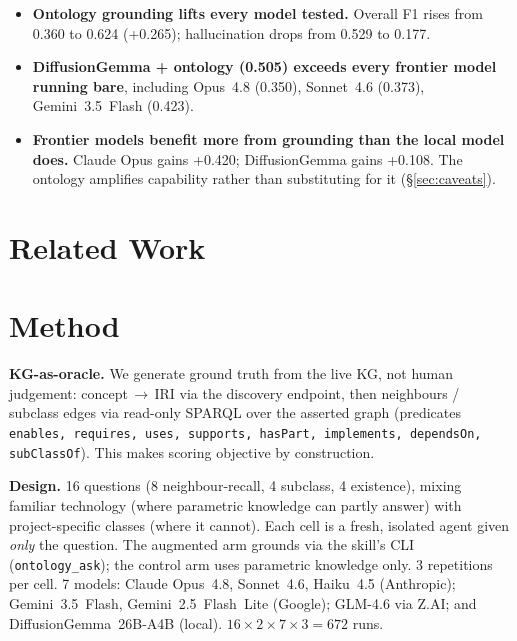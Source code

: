 \documentclass[11pt]{article}
\begin{document}
\begin{samepage}
\begin{itemize}[leftmargin=1.3em,nosep]
\item \textbf{Ontology grounding lifts every model tested.} Overall F1 rises from 0.360 to
      0.624 (\textcolor{burnt}{+0.265}); hallucination drops from 0.529 to 0.177.
\item \textbf{DiffusionGemma + ontology (0.505) exceeds every frontier model running bare},
      including Opus~4.8 (0.350), Sonnet~4.6 (0.373), Gemini~3.5~Flash (0.423).
\item \textbf{Frontier models benefit more from grounding than the local model does.}
      Claude Opus gains +0.420; DiffusionGemma gains +0.108. The ontology amplifies
      capability rather than substituting for it (\S\ref{sec:caveats}).
\end{itemize}
\end{samepage}

\section{Related Work}


\section{Method}

\begin{samepage}
\textbf{KG-as-oracle.} We generate ground truth from the live KG, not human judgement:
concept\,$\to$\,IRI via the discovery endpoint, then neighbours / subclass edges via read-only
SPARQL over the asserted graph (predicates \texttt{enables, requires, uses, supports, hasPart,
implements, dependsOn, subClassOf}). This makes scoring objective by construction.
\end{samepage}

\begin{samepage}
\textbf{Design.} 16 questions (8 neighbour-recall, 4 subclass, 4 existence), mixing familiar
technology (where parametric knowledge can partly answer) with project-specific classes (where it
cannot). Each cell is a fresh, isolated agent given \emph{only} the question. The augmented arm
grounds via the skill's CLI (\texttt{ontology\_ask}); the control arm uses parametric knowledge
only. 3 repetitions per cell. 7 models: Claude Opus~4.8, Sonnet~4.6, Haiku~4.5 (Anthropic);
Gemini~3.5~Flash, Gemini~2.5~Flash~Lite (Google); GLM-4.6 via Z.AI; and DiffusionGemma~26B-A4B
(local). $16 \times 2 \times 7 \times 3 = 672$ runs.
\end{samepage}
\end{document}
